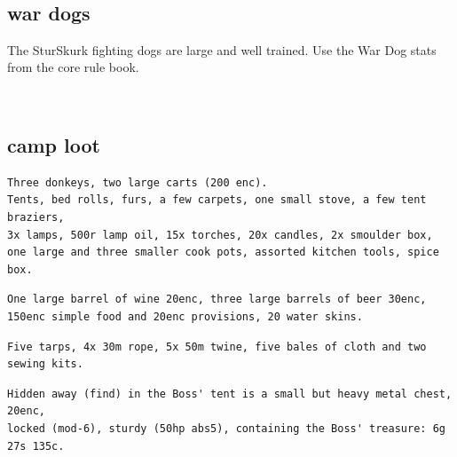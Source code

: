 \


\subsection*{war dogs}

The SturSkurk fighting dogs are large and well trained. Use the War Dog stats from the core rule book.

\


\goodbreak
\subsection*{camp loot}
\small \begin{samepage} \begin{verbatim}
Three donkeys, two large carts (200 enc). 
Tents, bed rolls, furs, a few carpets, one small stove, a few tent braziers,
3x lamps, 500r lamp oil, 15x torches, 20x candles, 2x smoulder box, 
one large and three smaller cook pots, assorted kitchen tools, spice box.
\end{verbatim} \end{samepage} \goodbreak \begin{samepage} \begin{verbatim}
One large barrel of wine 20enc, three large barrels of beer 30enc, 
150enc simple food and 20enc provisions, 20 water skins.
\end{verbatim} \end{samepage} \goodbreak \begin{samepage} \begin{verbatim}
Five tarps, 4x 30m rope, 5x 50m twine, five bales of cloth and two sewing kits.
\end{verbatim} \end{samepage} \goodbreak \begin{samepage} \begin{verbatim}
Hidden away (find) in the Boss' tent is a small but heavy metal chest, 20enc, 
locked (mod-6), sturdy (50hp abs5), containing the Boss' treasure: 6g 27s 135c.
\end{verbatim} \end{samepage} \normalsize

\


























